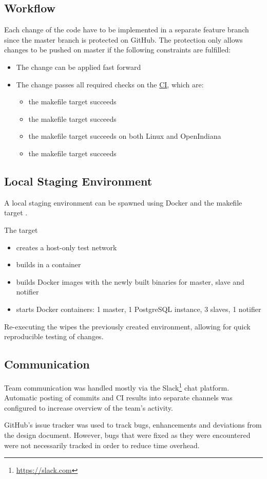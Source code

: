 \subsection{Workflow}
Each change of the code have to be implemented in a separate feature branch since the master branch is protected on GitHub. The protection 
only allows changes to be pushed on master if the following constraints are fulfilled:
\begin{itemize}
	\item The change can be applied fast forward
	\item The change passes all required checks on the \hyperref[ci]{CI}, which are:
	\begin{itemize}
		\item the  makefile target succeeds
		\item the  makefile target succeeds
		\item the  makefile target succeeds on both Linux and OpenIndiana
		\item the  makefile target succeeds
	\end{itemize}
\end{itemize}

\subsection{Local Staging Environment}
A local staging environment can be spawned using Docker and the makefile target .

The target
\begin{itemize}
  \item creates a host-only test network
  \item builds \mamid in a container
  \item builds Docker images with the newly built binaries for master, slave and notifier
  \item starts Docker containers: 1 master, 1 PostgreSQL instance, 3 slaves, 1 notifier
\end{itemize}

Re-executing the  wipes the previously created environment, allowing for quick reproducible testing of changes.

\subsection{Communication}

Team communication was handled mostly via the Slack\footnote{\url{https://slack.com}} chat platform.
Automatic posting of commits and CI results into separate channels was configured to increase overview of the team's activity.

GitHub's issue tracker was used to track bugs, enhancements and deviations from the design document.
However, bugs that were fixed as they were encountered were not necessarily tracked in order to reduce time overhead.

